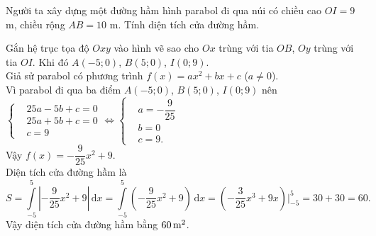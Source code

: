 \begin{ex}%
\immini
{
Người ta xây dựng một đường hầm hình parabol đi qua núi có chiều cao $OI=9$ m, chiều rộng $AB=10$ m. Tính diện tích cửa đường hầm.
}
{
}
\loigiai
{
Gắn hệ trục tọa độ $Oxy$ vào hình vẽ sao cho $Ox$ trùng với tia $OB$, $Oy$ trùng với tia $OI$. Khi đó $A(-5;0)$, $B(5;0)$, $I(0;9)$.\\
Giả sử parabol có phương trình $f(x)=ax^2+bx+c$ ($a\neq 0$).\\
Vì parabol đi qua ba điểm $A(-5;0)$, $B(5;0)$, $I(0;9)$ nên
$\left\{\begin{aligned}&25a-5b+c=0 \\&25a+5b+c=0 \\&c=9\end{aligned}\right. \Leftrightarrow \left\{\begin{aligned}&a=-\dfrac{9}{25} \\&b=0 \\&c=9.\end{aligned}\right.$\\
Vậy $f(x)=-\dfrac{9}{25}x^2+9$.\\
Diện tích cửa đường hầm là
\[S=\displaystyle\int\limits_{-5}^5\left|-\dfrac{9}{25}x^2+9\right|\mathrm{\,d}x = \displaystyle\int\limits_{-5}^5\left(-\dfrac{9}{25}x^2+9\right)\mathrm{\,d}x = \left(-\dfrac{3}{25}x^3+9x\right)\bigg|_{-5}^5 = 30+30=60.\]
Vậy diện tích cửa đường hầm bằng $60\text{\,m}^2$.
}

\end{ex}

